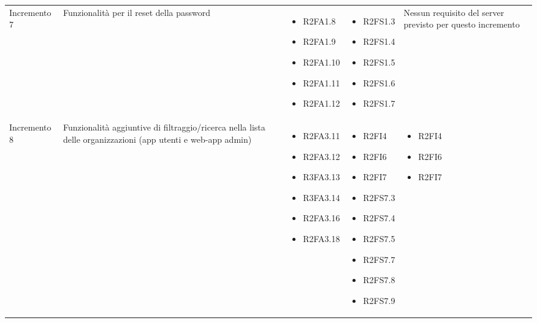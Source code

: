 {\begin{longtable}{C{2.5cm} C{3.2cm} C{2.8cm} C{2.8cm} C{2.8cm}}
Incremento 7 & Funzionalità per il reset della password & \begin{itemize}
    \item[ ] R2FA1.8
    \item[ ] R2FA1.9
    \item[ ] R2FA1.10
    \item[ ] R2FA1.11
    \item[ ] R2FA1.12
\end{itemize} & \begin{itemize} 
    \item[ ] R2FS1.3 %
    \item[ ] R2FS1.4 %
    \item[ ] R2FS1.5 %
    \item[ ] R2FS1.6 %
    \item[ ] R2FS1.7 %
\end{itemize} & 
    Nessun requisito del server previsto per questo incremento \\

Incremento 8 & Funzionalità aggiuntive di filtraggio/ricerca nella lista delle organizzazioni (app utenti e web-app admin) & \begin{itemize}
    \item[ ] R2FA3.11
    \item[ ] R2FA3.12
    \item[ ] R3FA3.13
    \item[ ] R3FA3.14
    \item[ ] R2FA3.16
    \item[ ] R2FA3.18
\end{itemize} & \begin{itemize} 
    \item[ ] R2FI4
    \item[ ] R2FI6
    \item[ ] R2FI7
    \item[ ] R2FS7.3
    \item[ ] R2FS7.4
    \item[ ] R2FS7.5
    \item[ ] R2FS7.7 
    \item[ ] R2FS7.8 
    \item[ ] R2FS7.9
\end{itemize} & \begin{itemize} 
    \item[ ] R2FI4
    \item[ ] R2FI6
    \item[ ] R2FI7
\end{itemize}\\


\end{longtable}}
